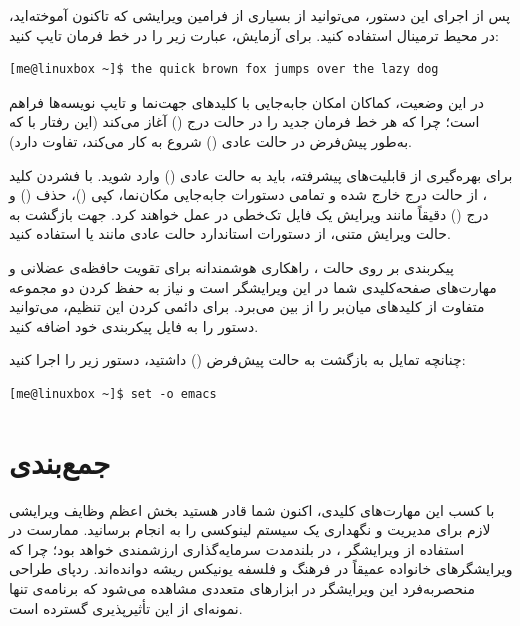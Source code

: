 پس از اجرای این دستور، می‌توانید از بسیاری از فرامین ویرایشی  که تاکنون آموخته‌اید، در محیط ترمینال استفاده کنید. برای آزمایش، عبارت زیر را در خط فرمان تایپ کنید:

\begin{latin}
\begin{lstlisting}
[me@linuxbox ~]$ the quick brown fox jumps over the lazy dog
\end{lstlisting}
\end{latin}

در این وضعیت، کماکان امکان جابه‌جایی با کلیدهای جهت‌نما و تایپ نویسه‌ها فراهم است؛ چرا که  هر خط فرمان جدید را در حالت درج () آغاز می‌کند (این رفتار با  که به‌طور پیش‌فرض در حالت عادی () شروع به کار می‌کند، تفاوت دارد).

برای بهره‌گیری از قابلیت‌های پیشرفته، باید به حالت عادی () وارد شوید. با فشردن کلید ، از حالت درج خارج شده و تمامی دستورات جابه‌جایی مکان‌نما، کپی ()، حذف () و درج () دقیقاً مانند ویرایش یک فایل تک‌خطی در  عمل خواهند کرد. جهت بازگشت به حالت ویرایش متنی، از دستورات استاندارد حالت عادی مانند  یا  استفاده کنید.

پیکربندی  بر روی حالت ، راهکاری هوشمندانه برای تقویت حافظه‌ی عضلانی و مهارت‌های صفحه‌کلیدی شما در این ویرایشگر است و نیاز به حفظ کردن دو مجموعه متفاوت از کلیدهای میان‌بر را از بین می‌برد. برای دائمی کردن این تنظیم، می‌توانید دستور  را به فایل پیکربندی  خود اضافه کنید.

چنانچه تمایل به بازگشت به حالت پیش‌فرض () داشتید، دستور زیر را اجرا کنید:

\begin{latin}
\begin{lstlisting}
[me@linuxbox ~]$ set -o emacs
\end{lstlisting}
\end{latin}

\section{جمع‌بندی}

با کسب این مهارت‌های کلیدی، اکنون شما قادر هستید بخش اعظم وظایف ویرایشی لازم برای مدیریت و نگهداری یک سیستم لینوکسی را به انجام برسانید. ممارست در استفاده از ویرایشگر ، در بلندمدت سرمایه‌گذاری ارزشمندی خواهد بود؛ چرا که ویرایشگرهای خانواده  عمیقاً در فرهنگ و فلسفه یونیکس ریشه دوانده‌اند. ردپای طراحی منحصربه‌فرد این ویرایشگر در ابزارهای متعددی مشاهده می‌شود که برنامه‌ی  تنها نمونه‌ای از این تأثیرپذیری گسترده است.

